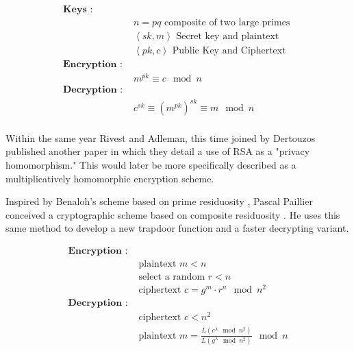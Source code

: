\documentclass[]{article}
\begin{document}
\begingroup
\setlength{\FrameSep}{-0.5em}
\begin{framed}	
	\begin{align*}
	\textbf{Keys : } & \\
	& n = pq \text{ composite of two large primes } \\
	& \left\langle sk, m \right\rangle \text{ Secret key and plaintext} \\
	& \left\langle pk, c \right\rangle \text{ Public Key and Ciphertext} \\
	\textbf{Encryption : } & \\
	& m^{pk} \equiv c \mod n \\
	\textbf{Decryption : } & \\
	& c^{sk} \equiv (m^{pk})^{sk} \equiv m \mod n \\	
	\end{align*}
\end{framed}
\vspace{-1.25em}
\vspace{1.5em}
\endgroup

Within the same year Rivest and Adleman, this time joined by Dertouzos published another paper in which they detail a use of RSA as a "privacy homomorphism." \cite{Rivest1978-2} 
This would later be more specifically described as a multiplicatively homomorphic encryption scheme.

Inspired by Benaloh's scheme based on prime residuosity \cite{Benaloh1994}, Pascal Paillier conceived a cryptographic scheme based on composite residuosity \cite{Paillier1999}. 
He uses this same method to develop a new trapdoor function and a faster decrypting variant.
 
\begingroup
\setlength{\FrameSep}{-0.5em}
\begin{framed}	
	\begin{align*}
		\textbf{Encryption : } & \\
		& \text{plaintext  } m < n \\ 
		& \text{select a random  } r < n \\
		& \text{ciphertext  } c = g^m \cdot r^n \mod n^2 \\
		\textbf{Decryption : } & \\
		& \text{ciphertext  } c < n^2  \\
		& \text{plaintext  } 
		m = \frac{L(c^\lambda \mod n^2)}{L(g^\lambda \mod n^2)} \mod n \\
	\end{align*}
\end{framed}
\vspace{-1.25em}
\vspace{1.5em}
\endgroup
\end{document}

